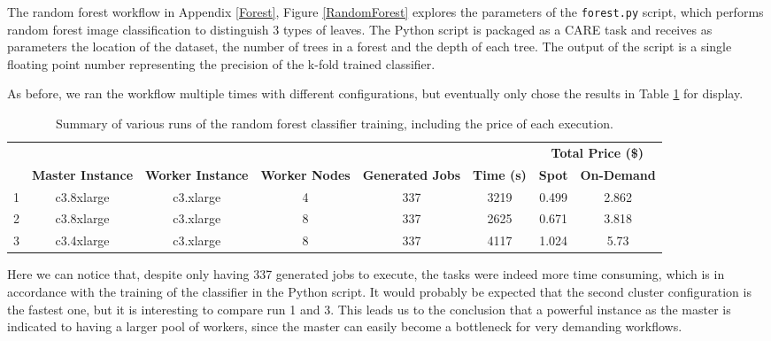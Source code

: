 The random forest workflow in Appendix \ref{Forest}, Figure \ref{RandomForest} explores the parameters of the \verb|forest.py| script, which performs random forest image classification \cite{RandFor} to distinguish 3 types of leaves. The Python script is packaged as a CARE task and receives as parameters the location of the dataset, the number of trees in a forest and the depth of each tree. The output of the script is a single floating point number representing the precision of the k-fold trained classifier.

As before, we ran the workflow multiple times with different configurations, but eventually only chose the results in Table \ref{ForestTable} for display.

\begin{table}[h]
\centering
\begin{adjustbox}{width=1\textwidth}
\begin{tabular}{cccccccc}
 &  &  &  &  &  & \multicolumn{2}{c}{\textbf{Total Price (\$)}} \\ \cline{7-8} 
\textbf{} & \textbf{Master Instance} & \textbf{Worker Instance} & \textbf{Worker Nodes} & \textbf{Generated Jobs} & \multicolumn{1}{c|}{\textbf{Time (s)}} & \multicolumn{1}{c|}{\textbf{Spot}} & \multicolumn{1}{c|}{\textbf{On-Demand}} \\ \cline{2-8} 
\multicolumn{1}{c|}{1} & \multicolumn{1}{c|}{c3.8xlarge} & \multicolumn{1}{c|}{c3.xlarge} & \multicolumn{1}{c|}{4} & \multicolumn{1}{c|}{337} & \multicolumn{1}{c|}{3219} & \multicolumn{1}{c|}{0.499} & \multicolumn{1}{c|}{2.862} \\ \cline{2-8} 
\multicolumn{1}{c|}{2} & \multicolumn{1}{c|}{c3.8xlarge} & \multicolumn{1}{c|}{c3.xlarge} & \multicolumn{1}{c|}{8} & \multicolumn{1}{c|}{337} & \multicolumn{1}{c|}{2625} & \multicolumn{1}{c|}{0.671} & \multicolumn{1}{c|}{3.818} \\ \cline{2-8} 
\multicolumn{1}{c|}{3} & \multicolumn{1}{c|}{c3.4xlarge} & \multicolumn{1}{c|}{c3.xlarge} & \multicolumn{1}{c|}{8} & \multicolumn{1}{c|}{337} & \multicolumn{1}{c|}{4117} & \multicolumn{1}{c|}{1.024} & \multicolumn{1}{c|}{5.73} \\ \cline{2-8} 
\end{tabular}
\end{adjustbox}
\caption{Summary of various runs of the random forest classifier training, including the price of each execution.}
\label{ForestTable}
\end{table}

Here we can notice that, despite only having 337 generated jobs to execute, the tasks were indeed more time consuming, which is in accordance with the training of the classifier in the Python script. It would probably be expected that the second cluster configuration is the fastest one, but it is interesting to compare run 1 and 3. This leads us to the conclusion that a powerful instance as the master is indicated to having a larger pool of workers, since the master can easily become a bottleneck for very demanding workflows.

